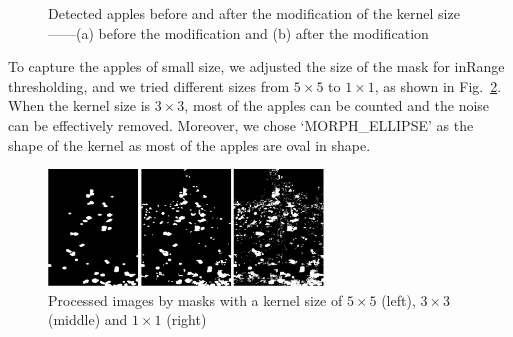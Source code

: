 \begin{figure}[!htb]
    \centering
    \caption{Detected apples before and after the modification of the kernel size——(a) before the modification and (b) after the modification}
    \label{fig:detected_before_after}
\end{figure}

To capture the apples of small size, we adjusted the size of the mask for inRange thresholding, and we tried different sizes from $5\times 5$ to $1\times 1$, as shown in Fig.~\ref{fig:diff_mask_kernelsize}. When the kernel size is $3\times 3$, most of the apples can be counted and the noise can be effectively removed. Moreover, we chose ‘MORPH\_ELLIPSE’ as the shape of the kernel as most of the apples are oval in shape.

\begin{figure}[htb]
    \centering
    \includegraphics[width=0.65\textwidth]{images/diff_kernel_size.png}
    \caption{Processed images by masks with a kernel size of $5\times 5$ (left), $3\times 3$ (middle) and $1\times 1$ (right)}
    \label{fig:diff_mask_kernelsize}
\end{figure}

